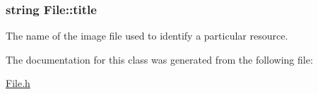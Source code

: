 \subsubsection[{\texorpdfstring{title}{title}}]{\setlength{\rightskip}{0pt plus 5cm}string File\+::title\hspace{0.3cm}{\ttfamily [private]}}\hypertarget{classFile_a302a98ac2a5820e288e9be26d5947bc4}{}\label{classFile_a302a98ac2a5820e288e9be26d5947bc4}
The name of the image file used to identify a particular resource. 

The documentation for this class was generated from the following file\+:\begin{DoxyCompactItemize}
\item 
\hyperlink{File_8h}{File.\+h}\end{DoxyCompactItemize}
